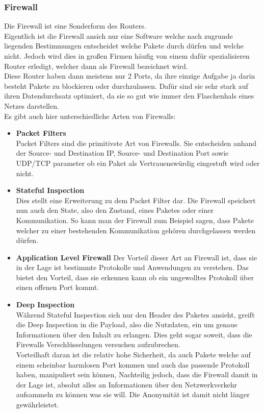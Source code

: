 \documentclass[11pt,a4paper]{report}
\begin{document}
\subsubsection{Firewall}
Die Firewall ist eine Sonderform des Routers.\\
Eigentlich ist die Firewall ansich nur eine Software welche nach zugrunde liegenden Bestimmungen entscheidet welche Pakete durch dürfen und welche nicht. Jedoch wird dies in großen Firmen häufig von einem dafür spezialisieren Router erledigt, welcher dann als Firewall bezeichnet wird.\\
Diese Router haben dann meistens nur 2 Ports, da ihre einzige Aufgabe ja darin besteht Pakete zu blockieren oder durchzulassen. Dafür sind sie sehr stark auf ihren Datendurchsatz optimiert, da sie so gut wie immer den Flaschenhals eines Netzes darstellen.\\
Es gibt auch hier unterschiedliche Arten von Firewalls:\\
\begin{itemize}
\item \textbf{Packet Filters}\\
Packet Filters sind die primitivste Art von Firewalls. Sie entscheiden anhand der Source- und Destination IP, Source- und Destination Port sowie UDP/TCP parameter ob ein Paket als Vertrauenswürdig eingestuft wird oder nicht.
\item \textbf{Stateful Inspection}\\
Dies stellt eine Erweiterung zu dem Packet Filter dar. Die Firewall speichert nun auch den State, also den Zustand, eines Paketes oder einer Kommunikation. So kann man der Firewall zum Beispiel sagen, dass Pakete welcher zu einer bestehenden Kommunikation gehören durchgelassen werden dürfen. 
\item \textbf{Application Level Firewall}
Der Vorteil dieser Art an Firewall ist, dass sie in der Lage ist bestimmte Protokolle und Anwendungen zu \glqq verstehen\grqq . Das bietet den Vorteil, dass sie erkennen kann ob ein ungewolltes Protokoll über einen offenen Port kommt.
\item \textbf{Deep Inspection}\\
Während Stateful Inspection sich nur den Header des Paketes ansieht, greift die Deep Inspection in die Payload, also die Nutzdaten, ein um genaue Informationen über den Inhalt zu erlangen. Dies geht sogar soweit, dass die Firewalls Verschlüsselungen versuchen aufzubrechen.\\
Vorteilhaft daran ist die relativ hohe Sicherheit, da auch Pakete welche auf einem scheinbar harmlosen Port kommen und auch das passende Protokoll haben, manipuliert sein können, Nachteilig jedoch, dass die Firewall damit in der Lage ist, absolut alles an Informationen über den Netzwerkverkehr aufsammeln zu können was sie will. Die Anonymität ist damit nicht länger gewährleistet.
\end{itemize}
\end{document}
